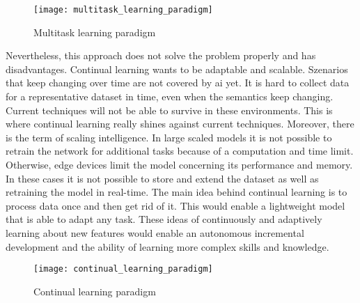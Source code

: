 \begin{figure}[H]
    \centering
    \texttt{[image: multitask\_learning\_paradigm]}
    \caption{Multitask learning paradigm}
    \label{fig:intro_motivation_multitask_learning_paradigm}
\end{figure}

Nevertheless, this approach does not solve the problem properly and has disadvantages.
Continual learning wants to be adaptable and scalable.
Szenarios that keep changing over time are not covered by \acrshort{ai} yet.
It is hard to collect data for a representative dataset in time, even when the semantics keep changing.
Current techniques will not be able to survive in these environments.
This is where continual learning really shines against current techniques.
Moreover, there is the term of scaling intelligence.
In large scaled models it is not possible to retrain the network for additional tasks because of a computation and time limit.
Otherwise, edge devices limit the model concerning its performance and memory.
In these cases it is not possible to store and extend the dataset as well as retraining the model in real-time.
The main idea behind continual learning is to process data once and then get rid of it.
This would enable a lightweight model that is able to adapt any task.
These ideas of continuously and adaptively learning about new features would enable an autonomous incremental development and the ability of learning more complex skills and knowledge.
\cite{continual-ai-blog}

\begin{figure}[H]
    \centering
    \texttt{[image: continual\_learning\_paradigm]}
    \caption{Continual learning paradigm}
\end{figure}

